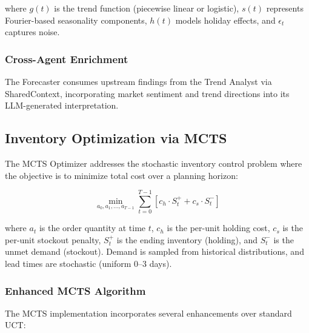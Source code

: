 \documentclass[conference]{IEEEtran}
\begin{document}
where $g(t)$ is the trend function (piecewise linear or logistic), $s(t)$ represents Fourier-based seasonality components, $h(t)$ models holiday effects, and $\epsilon_t$ captures noise.

\subsubsection{Cross-Agent Enrichment} The Forecaster consumes upstream findings from the Trend Analyst via SharedContext, incorporating market sentiment and trend directions into its LLM-generated interpretation.

\subsection{Inventory Optimization via MCTS}

The MCTS Optimizer addresses the stochastic inventory control problem where the objective is to minimize total cost over a planning horizon:

\begin{equation}
\min_{a_0, a_1, \ldots, a_{T-1}} \sum_{t=0}^{T-1} \left[ c_h \cdot S_t^+ + c_s \cdot S_t^- \right]
\label{eq:inventory_objective}
\end{equation}

where $a_t$ is the order quantity at time $t$, $c_h$ is the per-unit holding cost, $c_s$ is the per-unit stockout penalty, $S_t^+$ is the ending inventory (holding), and $S_t^-$ is the unmet demand (stockout). Demand is sampled from historical distributions, and lead times are stochastic (uniform 0--3 days).

\subsubsection{Enhanced MCTS Algorithm}

The MCTS implementation incorporates several enhancements over standard UCT:
\end{document}
